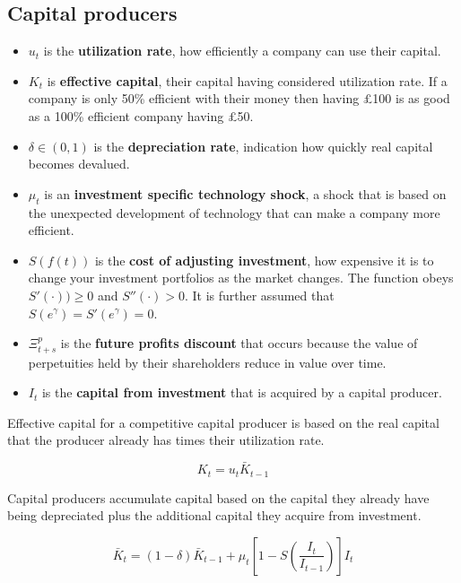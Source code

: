 \documentclass[notitlepage,12pt]{report}
\begin{document}
\begin{appendices}
	\subsection{Capital producers}
	\begin{itemize}
		\item \(u_t\) is the {\bf utilization rate}, how efficiently a company can use their capital.
		\item \(K_t\) is {\bf effective capital}, their capital having considered utilization rate. If a company is only 50\% efficient with their money then having \pounds100 is as good as a 100\% efficient company having \pounds50.
		\item \(\delta\in(0,1)\) is the {\bf depreciation rate}, indication how quickly real capital becomes devalued.
		\item \(\mu_t\) is an {\bf investment specific technology shock}, a shock that is based on the unexpected development of technology that can make a company more efficient.
		\item \(S(f(t))\) is the {\bf cost of adjusting investment}, how expensive it is to change your investment portfolios as the market changes. The function obeys \(S'(\cdot))\geq0\) and \(S''(\cdot)>0\). It is further assumed that \(S(e^\gamma)=S'(e^\gamma)=0\).
		\item \(\Xi_{t+s}^p\) is the {\bf future profits discount} that occurs because the value of perpetuities held by their shareholders reduce in value over time.
		\item \(I_t\) is the {\bf capital from investment} that is acquired by a capital producer.
		
	\end{itemize}
	
	Effective capital for a competitive capital producer is based on the real capital that the producer already has times their utilization rate.
	
	\begin{equation}
	K_t=u_t\bar{K}_{t-1}%
	\end{equation}
	
	Capital producers accumulate capital based on the capital they already have being depreciated plus the additional capital they acquire from investment.
	
	\begin{equation}
	\bar{K}_t=(1-\delta)\bar{K}_{t-1}+\mu_t\left[1-S\left(\frac{I_t}{I_{t-1}}\right)\right]I_t
	\end{equation}
	

\end{appendices}
\end{document}
